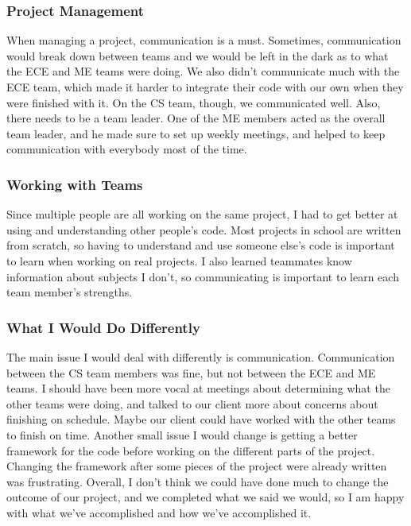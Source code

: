 \documentclass[10pt,letterpaper,onecolumn,draftclsnofoot,journal]{IEEEtran}
\begin{document}
\subsubsection{\textbf{Project Management}}
When managing a project, communication is a must. Sometimes, communication would break down between teams and we would be left in the dark as to what the ECE and ME teams were doing. We also didn't communicate much with the ECE team, which made it harder to integrate their code with our own when they were finished with it. On the CS team, though, we communicated well. Also, there needs to be a team leader. One of the ME members acted as the overall team leader, and he made sure to set up weekly meetings, and helped to keep communication with everybody most of the time.\vspace{.3cm}

\subsubsection{\textbf{Working with Teams}}
Since multiple people are all working on the same project, I had to get better at using and understanding other people's code. Most projects in school are written from scratch, so having to understand and use someone else's code is important to learn when working on real projects. I also learned teammates know information about subjects I don't, so communicating is important to learn each team member's strengths.\vspace{.3cm}

\subsubsection{\textbf{What I Would Do Differently}}
The main issue I would deal with differently is communication. Communication between the CS team members was fine, but not between the ECE and ME teams. I should have been more vocal at meetings about determining what the other teams were doing, and talked to our client more about concerns about finishing on schedule. Maybe our client could have worked with the other teams to finish on time. Another small issue I would change is getting a better framework for the code before working on the different parts of the project. Changing the framework after some pieces of the project were already written was frustrating. Overall, I don't think we could have done much to change the outcome of our project, and we completed what we said we would, so I am happy with what we've accomplished and how we've accomplished it.\vspace{.3cm}
\end{document}
